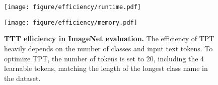 \begin{figure}[t]
  \centering
    \begin{minipage}{0.49\linewidth}
        \centering
        \texttt{[image: figure/efficiency/runtime.pdf]}
        \label{fig:runtime}
    \end{minipage}
    \hfill
    \begin{minipage}{0.49\linewidth}
        \centering
        \texttt{[image: figure/efficiency/memory.pdf]}
        \label{fig:memory}
    \end{minipage}
    \caption{\textbf{TTT efficiency in ImageNet evaluation.} The efficiency of TPT heavily depends on the number of classes and input text tokens. To optimize TPT, the number of tokens is set to 20, including the 4 learnable tokens, matching the length of the longest class name in the dataset.}
    \label{fig:efficiency}
\end{figure}